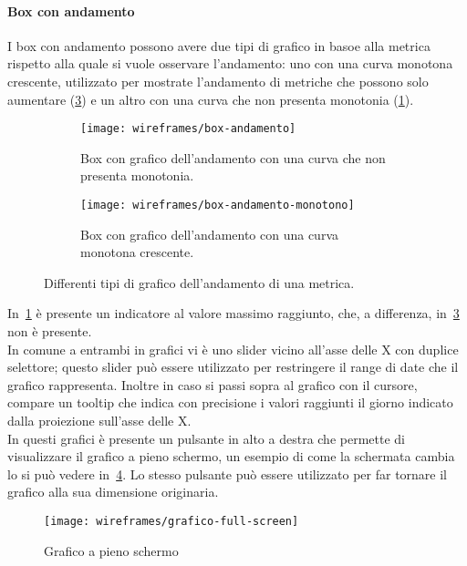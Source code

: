\paragraph{Box con andamento}
I box con andamento possono avere due tipi di grafico in basoe alla metrica rispetto alla quale si vuole osservare l'andamento: uno con una curva monotona crescente, utilizzato per mostrate l'andamento di metriche che possono solo aumentare (\ref{fig:box-andamento-monotono}) e un altro con una curva che non presenta monotonia (\ref{fig:box-andamento-no-monotonia}). 
\begin{figure}[H]
    \begin{subfigure}[b]{0.5\textwidth}
        \centering
        \texttt{[image: wireframes/box-andamento]}
        \caption{Box con grafico dell'andamento con una curva che non presenta monotonia.}\label{fig:box-andamento-no-monotonia}
    \end{subfigure}
\hfill
    \begin{subfigure}[b]{0.5\textwidth}
        \centering
        \texttt{[image: wireframes/box-andamento-monotono]}
        \caption{Box con grafico dell'andamento con una curva monotona crescente.}\label{fig:box-andamento-monotono}
    \end{subfigure}
    \caption{Differenti tipi di grafico dell'andamento di una metrica.}
\end{figure}

In~\ref{fig:box-andamento-no-monotonia} è presente un indicatore al valore massimo raggiunto, che, a differenza, in~\ref{fig:box-andamento-monotono} non è presente.\\
In comune a entrambi in grafici vi è uno slider vicino all'asse delle X con duplice selettore; questo slider può essere utilizzato per restringere il range di date che il grafico rappresenta. Inoltre in caso si passi sopra al grafico con il cursore, compare un tooltip che indica con precisione i valori raggiunti il giorno indicato dalla proiezione sull'asse delle X.\\
In questi grafici è presente un pulsante in alto a destra che permette di visualizzare il grafico a pieno schermo, un esempio di come la schermata cambia lo si può vedere in~\ref{fig:grafico-full-screen}. Lo stesso pulsante può essere utilizzato per far tornare il grafico alla sua dimensione originaria.
\begin{figure}[H]
    \centering
    \texttt{[image: wireframes/grafico-full-screen]}
    \caption{Grafico a pieno schermo}\label{fig:grafico-full-screen}
\end{figure}


